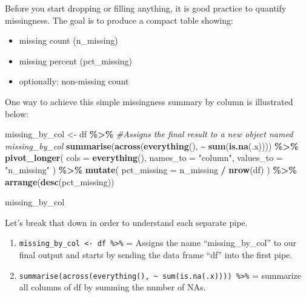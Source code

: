 \documentclass[
  11pt,
]{article}
\newenvironment{Shaded}{\begin{snugshade}}{\end{snugshade}}
\newcommand{\AttributeTok}[1]{\textcolor[rgb]{0.13,0.29,0.53}{#1}}
\newcommand{\CommentTok}[1]{\textcolor[rgb]{0.56,0.35,0.01}{\textit{#1}}}
\newcommand{\FunctionTok}[1]{\textcolor[rgb]{0.13,0.29,0.53}{\textbf{#1}}}
\newcommand{\NormalTok}[1]{#1}
\newcommand{\OtherTok}[1]{\textcolor[rgb]{0.56,0.35,0.01}{#1}}
\newcommand{\SpecialCharTok}[1]{\textcolor[rgb]{0.81,0.36,0.00}{\textbf{#1}}}
\newcommand{\StringTok}[1]{\textcolor[rgb]{0.31,0.60,0.02}{#1}}
\providecommand{\tightlist}{%
  \setlength{\itemsep}{0pt}\setlength{\parskip}{0pt}}
\begin{document}
Before you start dropping or filling anything, it is good practice to
quantify missingness. The goal is to produce a compact table showing:

\begin{itemize}
\tightlist
\item
  missing count (n\_missing)
\item
  missing percent (pct\_missing)
\item
  optionally: non-missing count
\end{itemize}

One way to achieve this simple missingness summary by column is
illustrated below:

\begin{Shaded}
\begin{Highlighting}[]
\NormalTok{missing\_by\_col }\OtherTok{\textless{}{-}}\NormalTok{ df }\SpecialCharTok{\%\textgreater{}\%}                                \CommentTok{\#Assigns the final result to a new object named missing\_by\_col}
  \FunctionTok{summarise}\NormalTok{(}\FunctionTok{across}\NormalTok{(}\FunctionTok{everything}\NormalTok{(), }\SpecialCharTok{\textasciitilde{}} \FunctionTok{sum}\NormalTok{(}\FunctionTok{is.na}\NormalTok{(.x)))) }\SpecialCharTok{\%\textgreater{}\%}
  \FunctionTok{pivot\_longer}\NormalTok{(}
    \AttributeTok{cols =} \FunctionTok{everything}\NormalTok{(),}
    \AttributeTok{names\_to =} \StringTok{"column"}\NormalTok{,}
    \AttributeTok{values\_to =} \StringTok{"n\_missing"}
\NormalTok{  ) }\SpecialCharTok{\%\textgreater{}\%}
  \FunctionTok{mutate}\NormalTok{(}
    \AttributeTok{pct\_missing =}\NormalTok{ n\_missing }\SpecialCharTok{/} \FunctionTok{nrow}\NormalTok{(df)}
\NormalTok{  ) }\SpecialCharTok{\%\textgreater{}\%}
  \FunctionTok{arrange}\NormalTok{(}\FunctionTok{desc}\NormalTok{(pct\_missing))}

\NormalTok{missing\_by\_col}
\end{Highlighting}
\end{Shaded}

Let's break that down in order to understand each separate pipe.

\begin{enumerate}
\def\labelenumi{\arabic{enumi}.}
\tightlist
\item
  \texttt{missing\_by\_col\ \textless{}-\ df\ \%\textgreater{}\%} =
  Assigns the name ``missing\_by\_col'' to our final output and starts
  by sending the data frame ``df'' into the first pipe.
\item
  \texttt{summarise(across(everything(),\ \textasciitilde{}\ sum(is.na(.x))))\ \%\textgreater{}\%}
  = summarize all columns of df by summing the number of NAs.
\end{enumerate}
\end{document}
